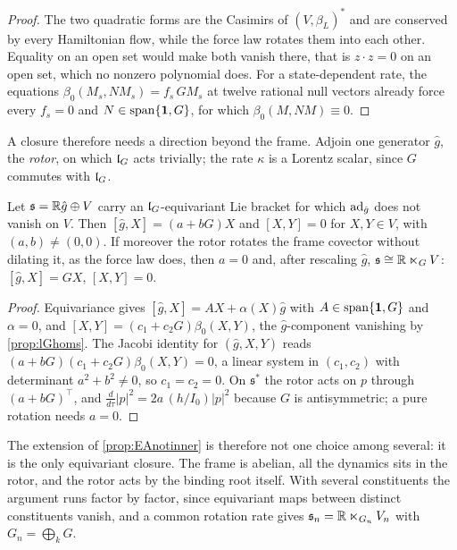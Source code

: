 \begin{proof}
The two quadratic forms are the Casimirs of $(V,\beta_L)^*$ and are conserved by every Hamiltonian flow, while the force law rotates them into
each other. Equality on an open set would make both vanish there, that is $z\cdot z=0$ on an open set, which no nonzero polynomial does. For a
state-dependent rate, the equations $\beta_0(M_s,NM_s)=f_s\,GM_s$ at twelve rational null vectors already force every $f_s=0$ and
$N\in\operatorname{span}\{\mathbf 1,G\}$, for which $\beta_0(M,NM)\equiv0$.
\end{proof}

A closure therefore needs a direction beyond the frame. Adjoin one generator $\hat g$, the \emph{rotor}, on which $\mathfrak l_G$ acts trivially; the rate
$\kappa$ is a Lorentz scalar, since $G$ commutes with $\mathfrak l_G$.

\begin{theorem}
\label{thm:closureunique}
Let $\mathfrak s=\mathbb{R}\hat g\oplus V$ carry an $\mathfrak l_G$-equivariant Lie bracket for which $\operatorname{ad}_{\hat g}$ does not vanish on $V$. Then
$[\hat g,X]=(a+bG)X$ and $[X,Y]=0$ for $X,Y\in V$, with $(a,b)\neq(0,0)$. If moreover the rotor rotates the frame covector without dilating it,
as the force law does, then $a=0$ and, after rescaling $\hat g$, $\mathfrak s\cong\mathbb{R}\ltimes_GV$: $[\hat g,X]=GX$, $[X,Y]=0$.
\end{theorem}

\begin{proof}
Equivariance gives $[\hat g,X]=AX+\alpha(X)\hat g$ with $A\in\operatorname{span}\{\mathbf 1,G\}$ and $\alpha=0$, and $[X,Y]=(c_1+c_2G)\beta_0(X,Y)$, the
$\hat g$-component vanishing by \cref{prop:lGhoms}. The Jacobi identity for $(\hat g,X,Y)$ reads $(a+bG)(c_1+c_2G)\beta_0(X,Y)=0$, a linear system in
$(c_1,c_2)$ with determinant $a^2+b^2\neq0$, so $c_1=c_2=0$. On $\mathfrak s^*$ the rotor acts on $p$ through $(a+bG)^{\!\top}$, and
$\tfrac{d}{d\tau}|p|^2=2a\,(h/I_0)|p|^2$ because $G$ is antisymmetric; a pure rotation needs $a=0$.
\end{proof}

The extension of \cref{prop:EAnotinner} is therefore not one choice among several: it is the only equivariant closure. The frame is abelian,
all the dynamics sits in the rotor, and the rotor acts by the binding root itself. With several constituents the argument runs factor by
factor, since equivariant maps between distinct constituents vanish, and a common rotation rate gives $\mathfrak s_n=\mathbb{R}\ltimes_{G_n}V_n$ with
$G_n=\bigoplus_kG$.

